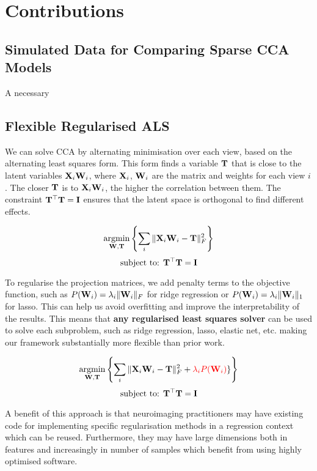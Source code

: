 \section{Contributions}

\subsection{Simulated Data for Comparing Sparse CCA Models}

A necessary 

\subsection{Flexible Regularised ALS}

We can solve CCA by alternating minimisation over each view, based on the alternating least squares form. This form finds a variable $\bold{T}$ that is close to the latent variables $\bold{X}_i\bold{W}_i$, where $\bold{X}_i$, $\bold{W}_i$ are the matrix and weights for each view $i$. The closer $\bold{T}$ is to $\bold{X}_i\bold{W}_i$, the higher the correlation between them. The constraint  $\bold{T^{\top}T}=\bold{I}$ ensures that the latent space is orthogonal to find different effects.

\[ \underset{\bold{W},\bold{T}}{\mathrm{argmin}}\left\{\sum_i \|\bold{X}_i\bold{W}_i-\bold{T}\|_{F}^2 \right\} \]
  \[ \text{subject to: } \bold{T^{\top}T}=\bold{I} \]

To regularise the projection matrices, we add penalty terms to the objective function, such as $P(\bold{W}_i)=\lambda_i\|\bold{W}_i\|_F$ for ridge regression or $P(\bold{W}_i)=\lambda_i\|\bold{W}_i\|_1$ for lasso. This can help us avoid overfitting and improve the interpretability of the results. This means that \textbf{any regularised least squares solver} can be used to solve each subproblem, such as ridge regression, lasso, elastic net, etc. making our framework substantially more flexible than prior work.

\[ \underset{\bold{W},\bold{T}}{\mathrm{argmin}}\left\{\sum_i \|\bold{X}_i\bold{W}_i-\bold{T}\|_{F}^2 + \textcolor{red}{\lambda_i P(\bold{W}_i)}\}\right\} \]
  \[ \text{subject to: } \bold{T^{\top}T}=\bold{I} \]

A benefit of this approach is that neuroimaging practitioners may have existing code for implementing specific regularisation methods in a regression context which can be reused. Furthermore, they may have large dimensions both in features and increasingly in number of samples which benefit from using highly optimised software. 

